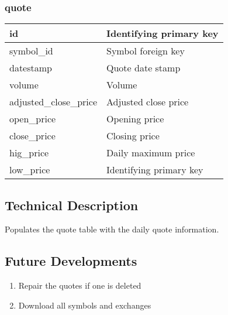 \subsubsection{quote}
\begin{tabular}{|l||l|}
	\hline
	id 						& Identifying primary key \\ \hline
	symbol\_id				& Symbol foreign key \\ \hline
	datestamp				& Quote date stamp \\ \hline
	volume					& Volume \\ \hline
	adjusted\_close\_price	& Adjusted close price \\ \hline
	open\_price				& Opening price \\ \hline
	close\_price				& Closing price \\ \hline
	hig\_price				& Daily maximum price \\ \hline
	low\_price				& Identifying primary key \\ \hline
\end{tabular}
\subsection{Technical Description}
Populates the quote table with the daily quote information.
\subsection{Future Developments}
\begin{enumerate}
	\item Repair the quotes if one is deleted
	\item Download all symbols and exchanges
\end{enumerate}
